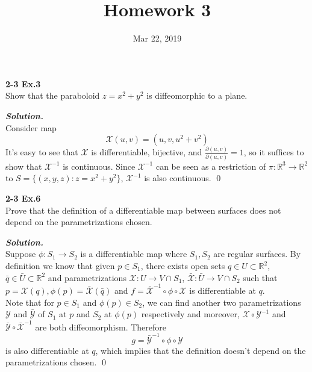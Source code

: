 \documentclass{article}
\begin{document}
\title{Homework 3}
\date{Mar 22, 2019}
\maketitle

\setlength\parindent{0em}   %
\setlength\parskip{1.0\baselineskip} %

\par
\textbf{2-3 Ex.3}\\
Show that the paraboloid $z=x^2+y^2$ is diffeomorphic to a plane.

\par
\textbf{\textit{Solution.}}\\
Consider map
$$
    \mathcal{X}(u,v)=(u,v,u^2+v^2)
$$
It's easy to see that $\mathcal{X}$ is differentiable, bijective, and 
$\frac{\partial{(u,v)}}{\partial{(u,v)}}=1$, so it suffices to show that
$\mathcal{X}^{-1}$ is continuous. Since $\mathcal{X}^{-1}$ can
be seen as a restriction of $\pi: \mathbb{R}^3 \to \mathbb{R}^2$ to 
$S=\{(x,y,z):z=x^2+y^2\}$, $\mathcal{X}^{-1}$ is also continuous. \qed

\par
\textbf{2-3 Ex.6}\\
Prove that the definition of a differentiable map between surfaces does
not depend on the parametrizations chosen.

\par
\textbf{\textit{Solution.}}\\
Suppose $\phi: S_1 \to S_2$ is a differentiable map where $S_1, S_2$ are
regular surfaces. By definition we know that given $p \in S_1$,
there exists open
sets $q \in U \subset \mathbb{R}^2$, 
$\bar{q} \in \bar{U} \subset \mathbb{R}^2$
and parametrizations $\mathcal{X}: U \to V \cap S_1$,
$\bar{\mathcal{X}}: \bar{U} \to V \cap S_2$
such that $p = \mathcal{X}(q), \phi(p) = \bar{\mathcal{X}}(\bar{q})$
and $f=\bar{\mathcal{X}}^{-1} \circ \phi \circ \mathcal{X}$
is differentiable at $q$.\\
Note that for $p \in S_1$ and $\phi(p) \in S_2$, we can find
another two parametrizations $\mathcal{Y}$ and $\bar{\mathcal{Y}}$
of $S_1$ at $p$ and $S_2$ at $\phi(p)$ respectively and
moreover,
$\mathcal{X} \circ \mathcal{Y}^{-1}$ and
$\bar{\mathcal{Y}} \circ \bar{\mathcal{X}}^{-1}$ are both
diffeomorphism. Therefore
$$
    g = \bar{\mathcal{Y}}^{-1} \circ \phi \circ \mathcal{Y}
$$
is also differentiable at $q$, which implies that the 
definition doesn't depend on the parametrizations chosen. \qed
\end{document}

